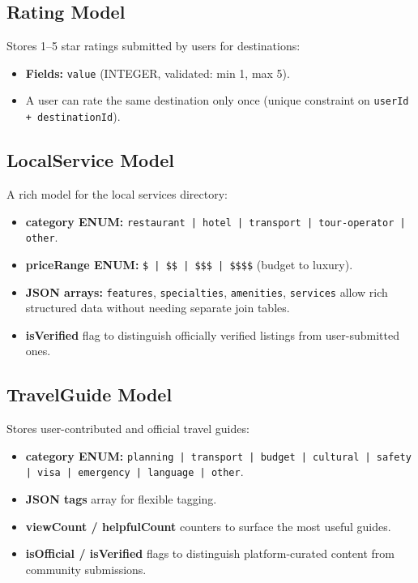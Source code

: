 \documentclass[12pt,a4paper]{report}
\begin{document}
\subsection{Rating Model}

Stores 1--5 star ratings submitted by users for destinations:

\begin{itemize}[leftmargin=2em]
  \item \textbf{Fields:} \texttt{value} (INTEGER, validated: min 1, max 5).
  \item A user can rate the same destination only once (unique constraint on \texttt{userId + destinationId}).
\end{itemize}

\subsection{LocalService Model}

A rich model for the local services directory:

\begin{itemize}[leftmargin=2em]
  \item \textbf{category ENUM:} \texttt{restaurant | hotel | transport | tour-operator | other}.
  \item \textbf{priceRange ENUM:} \texttt{\$ | \$\$ | \$\$\$ | \$\$\$\$} (budget to luxury).
  \item \textbf{JSON arrays:} \texttt{features}, \texttt{specialties}, \texttt{amenities}, \texttt{services} allow rich structured data without needing separate join tables.
  \item \textbf{isVerified} flag to distinguish officially verified listings from user-submitted ones.
\end{itemize}

\subsection{TravelGuide Model}

Stores user-contributed and official travel guides:

\begin{itemize}[leftmargin=2em]
  \item \textbf{category ENUM:} \texttt{planning | transport | budget | cultural | safety | visa | emergency | language | other}.
  \item \textbf{JSON tags} array for flexible tagging.
  \item \textbf{viewCount / helpfulCount} counters to surface the most useful guides.
  \item \textbf{isOfficial / isVerified} flags to distinguish platform-curated content from community submissions.
\end{itemize}
\end{document}
